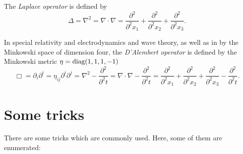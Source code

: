 The {\em Laplace operator}
is defined by
\begin{equation}
\Delta = \nabla^2= \nabla \cdot \nabla =
\frac{\partial^2 }{\partial^2 x_1}+
\frac{\partial^2 }{\partial^2 x_2}+
\frac{\partial^2 }{\partial^2 x_3}
.
\end{equation}

In special relativity and electrodynamics  and wave theory, as well as in by the Minkowski space of dimension four,
the {\em D'Alembert operator}
is defined by the Minkowski metric $\eta = {\rm diag} (1,1,1,-1)$
\begin{equation}
\Box  = \partial_i \partial^i
=
\eta_{ij}  \partial^i \partial^j=
\nabla^2- \frac{\partial^2 }{\partial^2 t}=
\nabla \cdot \nabla - \frac{\partial^2 }{\partial^2 t}=
\frac{\partial^2 }{\partial^2 x_1}+
\frac{\partial^2 }{\partial^2 x_2}+
\frac{\partial^2 }{\partial^2 x_3}- \frac{\partial^2 }{\partial^2 t}
.
\end{equation}



\section{Some tricks}

There are some tricks which are commonly used.
Here, some of them are enumerated:

